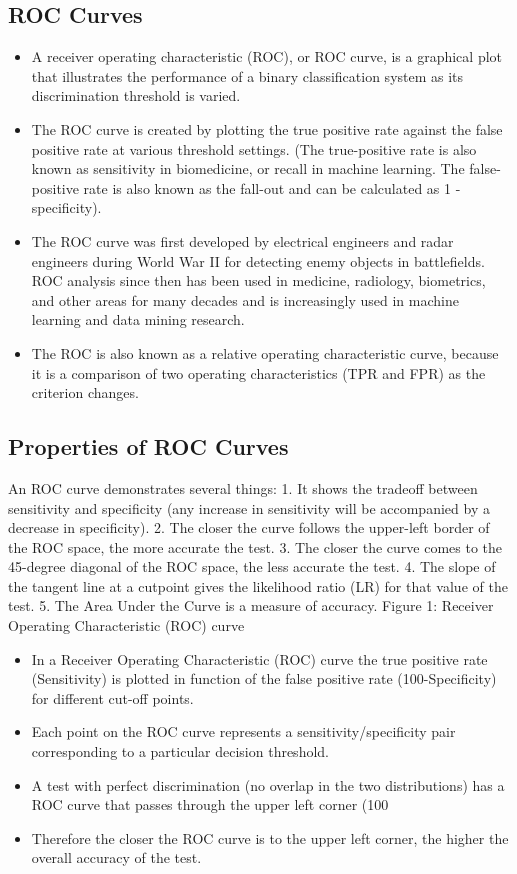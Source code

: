 \documentclass[]{report}
\begin{document}
\subsection{ROC Curves}
\begin{itemize}
\item  A receiver operating characteristic (ROC), or ROC curve, is a graphical plot that illustrates
the performance of a binary classification system as its discrimination threshold is varied.
\item  The ROC curve is created by plotting the true positive rate against the false positive rate at
various threshold settings. (The true-positive rate is also known as sensitivity in biomedicine,
or recall in machine learning. The false-positive rate is also known as the fall-out and can be
calculated as 1 - specificity).
\item  The ROC curve was first developed by electrical engineers and radar engineers during World
War II for detecting enemy objects in battlefields. ROC analysis since then has been used in
medicine, radiology, biometrics, and other areas for many decades and is increasingly used
in machine learning and data mining research.
\item  The ROC is also known as a relative operating characteristic curve, because it is a comparison
of two operating characteristics (TPR and FPR) as the criterion changes.
\end{itemize}
\subsection{Properties of ROC Curves}
An ROC curve demonstrates several things:
1. It shows the tradeoff between sensitivity and specificity (any increase in sensitivity will be
accompanied by a decrease in specificity).
2. The closer the curve follows the upper-left border of the ROC space, the more accurate the
test.
3. The closer the curve comes to the 45-degree diagonal of the ROC space, the less accurate the
test.
4. The slope of the tangent line at a cutpoint gives the likelihood ratio (LR) for that value of
the test.
5. The Area Under the Curve is a measure of accuracy.
Figure 1: Receiver Operating Characteristic (ROC) curve

\begin{itemize}
\item  In a Receiver Operating Characteristic (ROC) curve the true positive rate (Sensitivity) is
plotted in function of the false positive rate (100-Specificity) for different cut-off points.
\item  Each point on the ROC curve represents a sensitivity/specificity pair corresponding to a
particular decision threshold.

\item  A test with perfect discrimination (no overlap in the two distributions) has a ROC curve that
passes through the upper left corner (100%
\item  Therefore the closer the ROC curve is to the upper left corner, the higher the overall accuracy
of the test.

\end{itemize}
\end{document}
